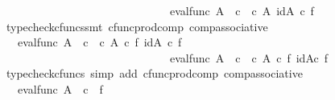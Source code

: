 \begin{isabellebody}
\ \ \ \ \ \ \ \ \ \ \ \ \ \ \ \ \ \ \ \ \ \ \ \ \ \ \ \ \ \ eval{\isacharunderscore}{\kern0pt}func\ A\ {\isasymOmega}\ {\isasymcirc}\isactrlsub c\ {\isasymlangle}{\isasymf}\ {\isasymcirc}\isactrlsub c\ {\isasymbeta}\isactrlbsub A\isactrlbsup {\isasymOmega}\isactrlesup \isactrlesub {\isacharcomma}{\kern0pt}\ id{\isacharparenleft}{\kern0pt}A\isactrlbsup {\isasymOmega}\isactrlesup {\isacharparenright}{\kern0pt}{\isasymrangle}\ {\isasymcirc}\isactrlsub c\ f{\isasymrangle}{\isachardoublequoteclose}\isanewline
\ \ \ \ \ \ \ \ \ \ \ \ \isamarkupfalse%
\ {\isacharparenleft}{\kern0pt}typecheck{\isacharunderscore}{\kern0pt}cfuncs{\isacharcomma}{\kern0pt}smt\ cfunc{\isacharunderscore}{\kern0pt}prod{\isacharunderscore}{\kern0pt}comp\ comp{\isacharunderscore}{\kern0pt}associative{}{\isacharparenright}{\kern0pt}\isanewline
\ \ \ \ \ \ \ \ \ \ \isamarkupfalse%
\ \isamarkupfalse%
\ {\isachardoublequoteopen}{\isachardot}{\kern0pt}{\isachardot}{\kern0pt}{\isachardot}{\kern0pt}\ {\isacharequal}{\kern0pt}\ {\isasymlangle}eval{\isacharunderscore}{\kern0pt}func\ A\ {\isasymOmega}\ {\isasymcirc}\isactrlsub c\ {\isasymlangle}{\isasymt}\ {\isasymcirc}\isactrlsub c\ {\isasymbeta}\isactrlbsub A\isactrlbsup {\isasymOmega}\isactrlesup \isactrlesub \ {\isasymcirc}\isactrlsub c\ f{\isacharcomma}{\kern0pt}\ id{\isacharparenleft}{\kern0pt}A\isactrlbsup {\isasymOmega}\isactrlesup {\isacharparenright}{\kern0pt}\ {\isasymcirc}\isactrlsub c\ f{\isasymrangle}{\isacharcomma}{\kern0pt}\isanewline
\ \ \ \ \ \ \ \ \ \ \ \ \ \ \ \ \ \ \ \ \ \ \ \ \ \ \ \ \ \ eval{\isacharunderscore}{\kern0pt}func\ A\ {\isasymOmega}\ {\isasymcirc}\isactrlsub c\ {\isasymlangle}{\isasymf}\ {\isasymcirc}\isactrlsub c\ {\isasymbeta}\isactrlbsub A\isactrlbsup {\isasymOmega}\isactrlesup \isactrlesub \ {\isasymcirc}\isactrlsub c\ f{\isacharcomma}{\kern0pt}\ id{\isacharparenleft}{\kern0pt}A\isactrlbsup {\isasymOmega}\isactrlesup {\isacharparenright}{\kern0pt}{\isasymcirc}\isactrlsub c\ f{\isasymrangle}{\isasymrangle}{\isachardoublequoteclose}\isanewline
\ \ \ \ \ \ \ \ \ \ \ \ \isamarkupfalse%
\ {\isacharparenleft}{\kern0pt}typecheck{\isacharunderscore}{\kern0pt}cfuncs{\isacharcomma}{\kern0pt}\ simp\ add{\isacharcolon}{\kern0pt}\ cfunc{\isacharunderscore}{\kern0pt}prod{\isacharunderscore}{\kern0pt}comp\ comp{\isacharunderscore}{\kern0pt}associative{}{\isacharparenright}{\kern0pt}\isanewline
\ \ \ \ \ \ \ \ \ \ \isamarkupfalse%
\ \isamarkupfalse%
\ {\isachardoublequoteopen}{\isachardot}{\kern0pt}{\isachardot}{\kern0pt}{\isachardot}{\kern0pt}\ {\isacharequal}{\kern0pt}\ {\isasymlangle}eval{\isacharunderscore}{\kern0pt}func\ A\ {\isasymOmega}\ {\isasymcirc}\isactrlsub c\ {\isasymlangle}{\isasymt}{\isacharcomma}{\kern0pt}\ f{\isasymrangle}{\isacharcomma}{\kern0pt}\isanewline

\end{isabellebody}
